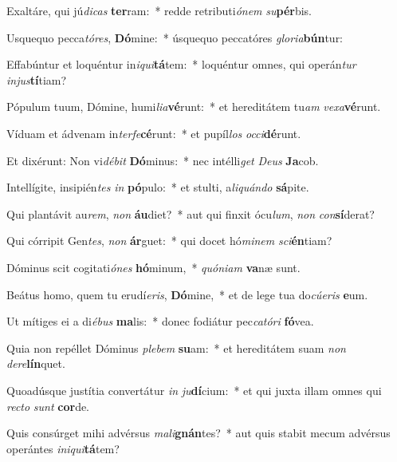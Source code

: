 \item Exaltáre, qui jú\textit{di}\textit{cas} \textbf{ter}ram:~* redde retributi\textit{ó}\textit{nem} \textit{su}\textbf{pér}bis.
\item Usquequo pecca\textit{tó}\textit{res}, \textbf{Dó}mine:~* úsquequo peccatóres \textit{glo}\textit{ri}\textit{a}\textbf{bún}tur:
\item Effabúntur et loquéntur in\textit{i}\textit{qui}\textbf{tá}tem:~* loquéntur omnes, qui operán\textit{tur} \textit{in}\textit{jus}\textbf{tí}tiam?
\item Pópulum tuum, Dómine, humi\textit{li}\textit{a}\textbf{vé}runt:~* et hereditátem tu\textit{am} \textit{ve}\textit{xa}\textbf{vé}runt.
\item Víduam et ádvenam in\textit{ter}\textit{fe}\textbf{cé}runt:~* et pupíl\textit{los} \textit{oc}\textit{ci}\textbf{dé}runt.
\item Et dixérunt: Non vi\textit{dé}\textit{bit} \textbf{Dó}minus:~* nec intélli\textit{get} \textit{De}\textit{us} \textbf{Ja}cob.
\item Intellígite, insipién\textit{tes} \textit{in} \textbf{pó}pulo:~* et stulti, a\textit{li}\textit{quán}\textit{do} \textbf{sá}pite.
\item Qui plantávit au\textit{rem}, \textit{non} \textbf{áu}diet?~* aut qui finxit ócu\textit{lum}, \textit{non} \textit{con}\textbf{sí}derat?
\item Qui córripit Gen\textit{tes}, \textit{non} \textbf{ár}guet:~* qui docet hó\textit{mi}\textit{nem} \textit{sci}\textbf{én}tiam?
\item Dóminus scit cogitati\textit{ó}\textit{nes} \textbf{hó}minum,~* \textit{quón}\textit{i}\textit{am} \textbf{va}næ sunt.
\item Beátus homo, quem tu erudí\textit{e}\textit{ris}, \textbf{Dó}mine,~* et de lege tua do\textit{cú}\textit{e}\textit{ris} \textbf{e}um.
\item Ut mítiges ei a di\textit{é}\textit{bus} \textbf{ma}lis:~* donec fodiátur pec\textit{ca}\textit{tó}\textit{ri} \textbf{fó}vea.
\item Quia non repéllet Dóminus \textit{ple}\textit{bem} \textbf{su}am:~* et hereditátem suam \textit{non} \textit{de}\textit{re}\textbf{lín}quet.
\item Quoadúsque justítia convertátur \textit{in} \textit{ju}\textbf{dí}cium:~* et qui juxta illam omnes qui \textit{rec}\textit{to} \textit{sunt} \textbf{cor}de.
\item Quis consúrget mihi advérsus \textit{ma}\textit{li}\textbf{gnán}tes?~* aut quis stabit mecum advérsus operántes \textit{in}\textit{i}\textit{qui}\textbf{tá}tem?
